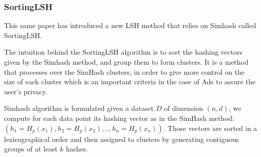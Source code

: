 \subsubsection{SortingLSH}
This same paper \citep{google_floc_2020} has introduced a new LSH method that
relies on Simhash called SortingLSH.

The intuition behind the SortingLSH algorithm is to sort the hashing vectors
given by the Simhash method, and group them to form clusters. It is a method
that processes over the SimHash clusters, in order to give more control on the
size of each cluster which is an important criteria in the case of Ads to
assure the user's privacy.

Simhash algorithm is formulated given a dataset $D$ of dimension $(n, d)$, we
compute for each data point its hashing vector as in the SimHash method:
$(h_1=H_p (x_1) , h_2=H_p (x_2) ,.., h_n=H_p (x_n))$. Those vectors are sorted
in a \gls{lexicographical} order and then assigned to clusters by generating
contiguous groups of at least $k$ hashes.
